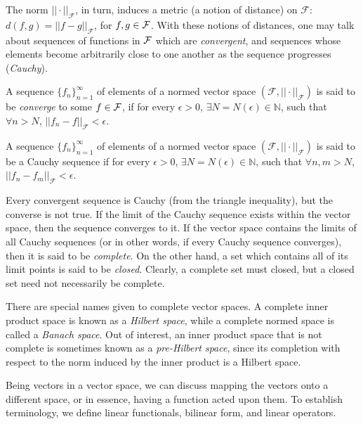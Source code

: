 The norm $||\cdot||_{\mathcal F}$, in turn, induces a metric (a notion of distance) on $\mathcal F$: $d(f,g) = ||f-g||_{\mathcal F}$, for $f,g\in{\mathcal F}$.
With these notions of distances, one may talk about sequences of functions in ${\mathcal F}$ which are \emph{convergent}, and sequences whose elements become arbitrarily close to one another as the sequence progresses (\emph{Cauchy}).

\begin{definition}
	A sequence $\{f_n\}_{n=1}^\infty$ of elements of a normed vector space $(\mathcal F, ||\cdot ||_{\mathcal F})$ is said to be \emph{converge} to some $f\in{\mathcal F}$, if for every $\epsilon > 0$, $\exists N=N(\epsilon) \in \mathbb N$, such that $\forall n > N$, $||f_n - f||_{\mathcal F} < \epsilon$.
\end{definition}

\begin{definition}
	A sequence $\{f_n\}_{n=1}^\infty$ of elements of a normed vector space $(\mathcal F, ||\cdot ||_{\mathcal F})$ is said to be a Cauchy sequence if for every $\epsilon > 0$, $\exists N=N(\epsilon) \in \mathbb N$, such that $\forall n,m > N$, $||f_n - f_m||_{\mathcal F} < \epsilon$.
\end{definition}

Every convergent sequence is Cauchy (from the triangle inequality), but the converse is not true.
If the limit of the Cauchy sequence exists within the vector space, then the sequence converges to it.
If the vector space contains the limits of all Cauchy sequences (or in other words, if every Cauchy sequence converges), then it is said to be \emph{complete}.
On the other hand, a set which contains all of its limit points is said to be \emph{closed}.
Clearly, a complete set must closed, but a closed set need not necessarily be complete.

There are special names given to complete vector spaces.
A complete inner product space is known as a \emph{Hilbert space}, while a complete normed space is called a \emph{Banach space}.
Out of interest, an inner product space that is not complete is sometimes known as a \emph{pre-Hilbert space}, since its completion with respect to the norm induced by the inner product is a Hilbert space.

Being vectors in a vector space, we can discuss mapping the vectors onto a different space, or in essence, having a function acted upon them.
To establish terminology, we define linear functionals, bilinear form, and linear operators.

